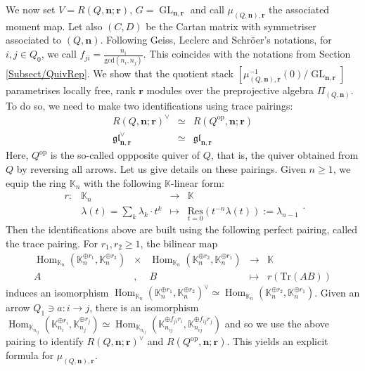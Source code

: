 \documentclass[11pt,english]{article}
\numberwithin{equation}{section}
\numberwithin{figure}{section}
\theoremstyle{definition}
\theoremstyle{plain}
\theoremstyle{remark}
\DeclareMathOperator{\Hom}{Hom}
\DeclareMathOperator{\GL}{GL}
\newcommand\nn{\mathbf{n}}
\newcommand\rr{\mathbf{r}}
\newcommand\KK{\mathbb{K}}
\begin{document}
We now set $V=R(Q,\nn;\rr)$, $G=\GL_{\nn,\rr}$ and call $\mu_{(Q,\nn),\rr}$
the associated moment map.\index[notations]{mu@$\mu_{(Q,\nn),\rr}$ - quiver moment map}
Let also $(C,D)$ be the Cartan matrix with symmetriser associated
to $(Q,\nn)$. Following Geiss, Leclerc and Schröer's notations, for
$i,j\in Q_{0}$, we call $f_{ji}=\frac{n_{i}}{\mathrm{gcd}(n_{i},n_{j})}$.
This coincides with the notations from Section \ref{Subsect/QuivRep}.
We show that the quotient stack $\left[\mu_{(Q,\nn),\rr}^{-1}(0)/\GL_{\nn,\rr}\right]$
parametrises locally free, rank $\rr$ modules over the preprojective
algebra $\Pi_{(Q,\nn)}$. To do so, we need to make two identifications
using trace pairings:\[
\begin{array}{rcl}
R(Q,\nn;\rr)^{\vee} & \simeq & R(Q^{\mathrm{op}},\nn;\rr) \\
\mathfrak{gl}_{\nn,\rr}^{\vee} & \simeq & \mathfrak{gl}_{\nn,\rr}
\end{array}
\] Here, $Q^{\mathrm{op}}$ is the so-called oppposite quiver of $Q$,
that is, the quiver obtained from $Q$ by reversing all arrows. Let
us give details on these pairings. Given $n\geq1$, we equip the ring
$\KK_{n}$ with the following $\KK$-linear form:\[
\begin{array}{rccl}
r: & \KK_n & \rightarrow & \KK \\
 & \lambda(t)=\sum_k\lambda_k\cdot t^k & \mapsto &\underset{t=0}{\mathrm{Res}}\left( t^{-n}\lambda(t)\right):=\lambda_{n-1}
\end{array}
.
\] Then the identifications above are built using the following perfect
pairing, called the trace pairing. For $r_{1},r_{2}\geq1$, the bilinear
map\[
\begin{array}{ccccl}
\Hom_{\KK_n}(\KK_n^{\oplus r_1},\KK_n^{\oplus r_2}) & \times & \Hom_{\KK_n}(\KK_n^{\oplus r_2},\KK_n^{\oplus r_1}) & \rightarrow & \KK \\
A & , & B & \mapsto & r\left(\mathrm{Tr}(AB)\right)
\end{array}
\] induces an isomorphism $\Hom_{\KK_{n}}(\KK_{n}^{\oplus r_{1}},\KK_{n}^{\oplus r_{2}})^{\vee}\simeq\Hom_{\KK_{n}}(\KK_{n}^{\oplus r_{2}},\KK_{n}^{\oplus r_{1}})$.
Given an arrow $Q_{1}\ni a:i\rightarrow j$, there is an isomorphism
$\Hom_{\KK_{n_{ij}}}(\KK_{n_{i}}^{\oplus r_{i}},\KK_{n_{j}}^{\oplus r_{j}})\simeq\Hom_{\KK_{n_{ij}}}(\KK_{n_{ij}}^{\oplus f_{ji}r_{i}},\KK_{n_{ij}}^{\oplus f_{ij}r_{j}})$
and so we use the above pairing to identify $R(Q,\nn;\rr)^{\vee}$
and $R(Q^{\mathrm{op}},\nn;\rr)$. This yields an explicit formula
for $\mu_{(Q,\nn),\rr}$.
\end{document}
